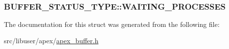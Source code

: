 \subsubsection[{\texorpdfstring{W\+A\+I\+T\+I\+N\+G\+\_\+\+P\+R\+O\+C\+E\+S\+S\+ES}{WAITING_PROCESSES}}]{ B\+U\+F\+F\+E\+R\+\_\+\+S\+T\+A\+T\+U\+S\+\_\+\+T\+Y\+P\+E\+::\+W\+A\+I\+T\+I\+N\+G\+\_\+\+P\+R\+O\+C\+E\+S\+S\+ES}\hypertarget{structBUFFER__STATUS__TYPE_ab631c9b531559f7782c6084c0ac5228c}{}\label{structBUFFER__STATUS__TYPE_ab631c9b531559f7782c6084c0ac5228c}


The documentation for this struct was generated from the following file\+:\begin{DoxyCompactItemize}
\item 
src/libuser/apex/\hyperlink{apex__buffer_8h}{apex\+\_\+buffer.\+h}\end{DoxyCompactItemize}
